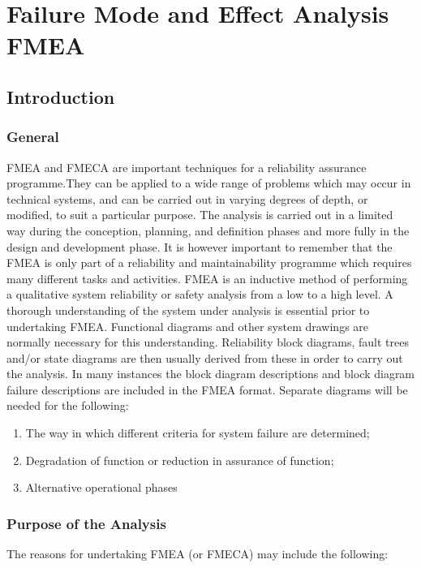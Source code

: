 \documentclass[./dissertation.tex]{subfiles}
\begin{document}
\newpage\null\thispagestyle{empty}\newpage
\chapter{Failure Mode and Effect Analysis FMEA}

\section{Introduction}
\subsection{General}
FMEA and FMECA are important techniques for a reliability assurance programme.They can be applied to a wide range of problems which may occur in technical systems, and can be carried out in varying degrees of depth, or modified, to suit a particular purpose. The analysis is carried out in a limited way during the conception, planning, and definition phases and more fully in the design and development phase. It is however important to remember that the FMEA is only part of a reliability and
maintainability programme which requires many different tasks and activities. FMEA is an inductive method of performing a qualitative system reliability or safety analysis from a low to a high level. A thorough understanding of the system under analysis is essential prior to undertaking FMEA. Functional diagrams and other system drawings are normally necessary for this understanding. Reliability block diagrams, fault trees and/or state diagrams are then usually derived from these in order to
carry out the analysis. In many instances the block diagram descriptions and block diagram failure descriptions are included in the FMEA format. Separate diagrams will be needed for the
following:
\begin{enumerate}
    \item The way in which different criteria for system failure are determined;
    \item Degradation of function or reduction in assurance of function;
    \item Alternative operational phases
\end{enumerate}

\subsection{Purpose of the Analysis}
The reasons for undertaking FMEA (or FMECA) may include the following:
\end{document}

